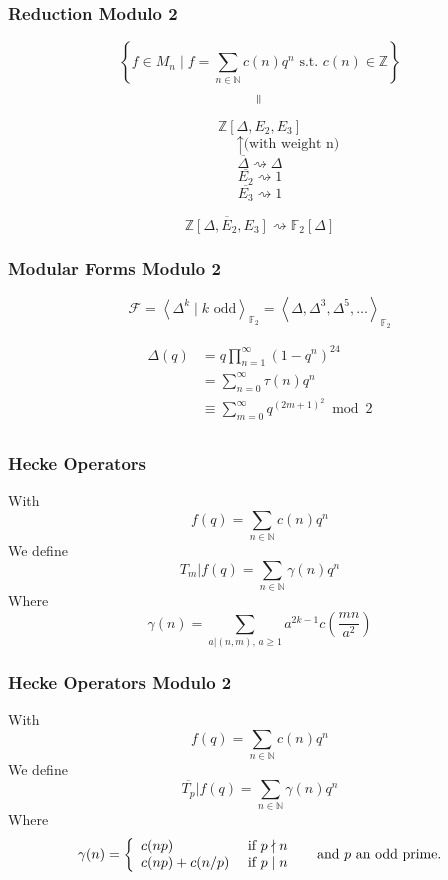 \documentclass[12pt]{beamer}
\begin{document}
	\begin{frame}
		\frametitle{Reduction Modulo 2}
		$$\left\lbrace f \in M_n \mid f = \sum_{n \in \mathbb{N}} c(n)q^n \text{ s.t. } c(n) \in \mathbb{Z} \right\rbrace$$
		$$\rotatebox{90}{$=$}$$
		$$\mathbb{Z}\left[ \Delta, E_2, E_3 \right]$$
		{\scriptsize $$\qquad\qquad \uparrow \text{(with weight n)}$$}
		$$\overline{\Delta} \rightsquigarrow \varDelta$$
		$$\overline{E_2} \rightsquigarrow 1$$
		$$\overline{E_3} \rightsquigarrow 1$$
		
		$$\overline{\mathbb{Z}\left[ \Delta, E_2, E_3 \right]} \rightsquigarrow \mathbb{F}_2 \left[ \varDelta \right]$$
		
		\vspace{1cm}
	\end{frame}

	\begin{frame}
		\frametitle{Modular Forms Modulo 2}
		$$
		\mathcal{F}
		= \left\langle \Delta^k \mid k \text{ odd} \right\rangle_{\mathbb{F}_2}
		= \left\langle \Delta, \Delta^3, \Delta^5, \dots \right\rangle_{\mathbb{F}_2}
		$$
		
		\begin{align*}
			\Delta(q)
			&= q \prod_{n=1}^{\infty} (1-q^n)^{24}\\
			&= \sum_{n=0}^{\infty} \tau(n)q^n\\
			&\equiv \sum_{m=0}^{\infty} q^{(2m+1)^2} \bmod 2\\
		\end{align*}
	\end{frame}
	
	\begin{frame}
		\frametitle{Hecke Operators}
		With
		$$
		f(q) = \sum_{n \in \mathbb{N}} c(n)q^n
		$$
		We define
		$$
		T_m|f(q) = \sum_{n \in \mathbb{N}} \gamma(n)q^n
		$$
		Where
		$$
		\gamma(n) = \sum_{a | (n,m),\, a \geq 1} a^{2k-1} c\left( \frac{mn}{a^2} \right)
		$$
	\end{frame}

	\begin{frame}
		\frametitle{Hecke Operators Modulo 2}
		With
		$$
		f(q) = \sum_{n \in \mathbb{N}} c(n)q^n
		$$
		We define
		$$
		\overline{T_p}|f(q) = \sum_{n \in \mathbb{N}} \gamma(n)q^n
		$$
		Where
		$$
		\gamma(n) = 
		\left\lbrace
		\begin{array}{l l}
		c(np)        & \text{ if } p \nmid n \\
		c(np)+c(n/p) & \text{ if } p \mid  n
		\end{array}
		\right. 
		\quad \text{ and } p \text{ an odd prime}.
		$$
	\end{frame}
\end{document}
